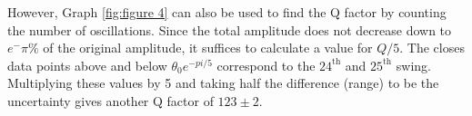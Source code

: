 \documentclass[12pt]{article}
\begin{document}
However, Graph \ref{fig:figure 4} can also be used to find the Q factor by counting the number of oscillations. Since the total amplitude does not decrease down to $e^-\pi \%$ of the original amplitude, it suffices to calculate a value for $Q/5$. The closes data points above and below $\theta_0e^{-{pi/5}}$ correspond to the $24^\text{th}$ and $25^\text{th}$ swing. Multiplying these values by 5 and taking half the difference (range) to be the uncertainty gives another Q factor of $123 \pm 2$.

\newpage

\printbibliography
\end{document}
